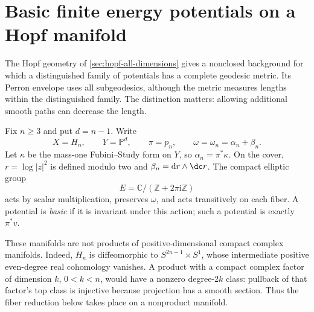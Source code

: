 \section{Basic finite energy potentials on a Hopf manifold}
\label{sec:hopf-basic-perron}

The Hopf geometry of \cref{sec:hopf-all-dimensions} gives a nonclosed background for which a distinguished family of potentials has a complete geodesic metric. Its Perron envelope uses all subgeodesics, although the metric measures lengths within the distinguished family. The distinction matters: allowing additional smooth paths can decrease the length.

Fix $n\geq3$ and put $d=n-1$. Write
\[
 X=H_n,\qquad Y=\mathbb P^d,\qquad \pi=p_n,
 \qquad \omega=\omega_n=\alpha_n+\beta_n.
\]
Let $\kappa$ be the mass-one Fubini--Study form on $Y$, so $\alpha_n=\pi^*\kappa$. On the cover, $r=\log|z|^2$ is defined modulo two and $\beta_n=\mathrm dr\wedge\dc r$. The compact elliptic group
\[
 E=\mathbb C/(\mathbb Z+2\pi\mathrm i\mathbb Z)
\]
acts by scalar multiplication, preserves $\omega$, and acts transitively on each fiber. A potential is \emph{basic} if it is invariant under this action; such a potential is exactly $\pi^*v$.

These manifolds are not products of positive-dimensional compact complex manifolds. Indeed, $H_n$ is diffeomorphic to $S^{2n-1}\times S^1$, whose intermediate positive even-degree real cohomology vanishes. A product with a compact complex factor of dimension $k$, $0<k<n$, would have a nonzero degree-$2k$ class: pullback of that factor's top class is injective because projection has a smooth section. Thus the fiber reduction below takes place on a nonproduct manifold.

